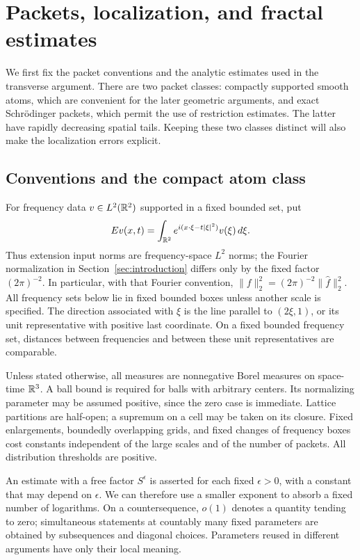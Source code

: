 \section{Packets, localization, and fractal estimates}
\label{sec:preliminaries}

We first fix the packet conventions and the analytic estimates used in the
transverse argument.  There are two packet classes: compactly supported smooth
atoms, which are convenient for the later geometric arguments, and exact
Schr\"odinger packets, which permit the use of restriction estimates.  The latter
have rapidly decreasing spatial tails.  Keeping these two classes distinct will
also make the localization errors explicit.

\subsection{Conventions and the compact atom class}

For frequency data $v\in L^2(\mathbb R^2)$ supported in a fixed bounded set, put
\begin{equation}
 Ev(x,t)=\int_{\mathbb R^2}e^{i(x\cdot\xi-t|\xi|^2)}v(\xi)\,d\xi.
 \label{eq:prelim-extension}
\end{equation}
Thus extension input norms are frequency-space $L^2$ norms; the Fourier
normalization in Section~\ref{sec:introduction} differs only by the fixed factor
$(2\pi)^{-2}$.  In particular, with that Fourier convention,
$\|f\|_2^2=(2\pi)^{-2}\|\widehat f\|_2^2$.
All frequency sets below lie in fixed bounded boxes unless another scale is
specified.  The direction associated with $\xi$ is the line parallel to
$(2\xi,1)$, or its unit representative with positive last coordinate.  On a
fixed bounded frequency set, distances between frequencies and between these
unit representatives are comparable.

Unless stated otherwise, all measures are nonnegative Borel measures on space-time $\mathbb R^3$.  A ball
bound is required for balls with arbitrary centers.  Its normalizing parameter
may be assumed positive, since the zero case is immediate.  Lattice partitions
are half-open; a supremum on a cell may be taken on its closure.  Fixed
enlargements, boundedly overlapping grids, and fixed changes of frequency boxes
cost constants independent of the large scales and of the number of packets.
All distribution thresholds are positive.

An estimate with a free factor $S^\epsilon$ is asserted for each fixed
$\epsilon>0$, with a constant that may depend on $\epsilon$.  We can therefore
use a smaller exponent to absorb a fixed number of logarithms.  On a
countersequence, $o(1)$ denotes a quantity tending to zero; simultaneous
statements at countably many fixed parameters are obtained by subsequences and
diagonal choices.  Parameters reused in different arguments have only their
local meaning.

